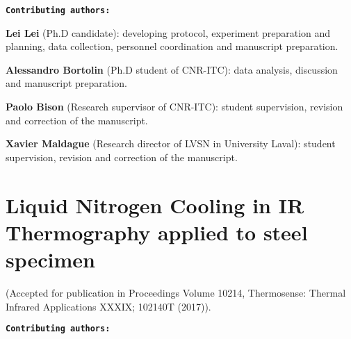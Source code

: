 \textbf{\texttt{Contributing authors:}}

\textbf{\textsf{Lei Lei}} (Ph.D candidate): developing protocol, experiment preparation and planning, data collection, personnel coordination and manuscript preparation.

\textbf{Alessandro Bortolin} (Ph.D student of CNR-ITC): data analysis, discussion and manuscript preparation.

\textbf{Paolo Bison} (Research supervisor of CNR-ITC): student supervision, revision and correction of the manuscript. 

\textbf{Xavier Maldague} (Research director of LVSN in University Laval): student supervision, revision and correction of the manuscript. 






\chapter{Liquid Nitrogen Cooling in IR Thermography applied to steel specimen}
(Accepted for publication in Proceedings Volume 10214, Thermosense: Thermal Infrared Applications XXXIX; 102140T (2017)).


%

\textbf{\texttt{Contributing authors:}}

